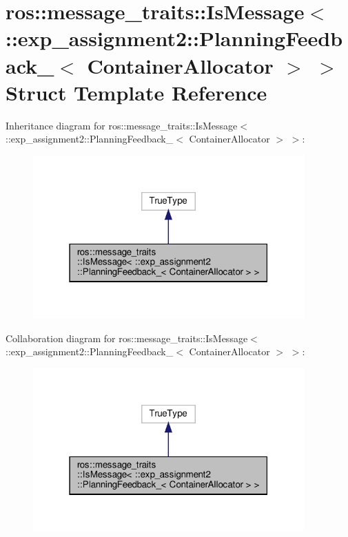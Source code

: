 \hypertarget{structros_1_1message__traits_1_1IsMessage_3_01_1_1exp__assignment2_1_1PlanningFeedback___3_01ContainerAllocator_01_4_01_4}{}\section{ros\+:\+:message\+\_\+traits\+:\+:Is\+Message$<$ \+:\+:exp\+\_\+assignment2\+:\+:Planning\+Feedback\+\_\+$<$ Container\+Allocator $>$ $>$ Struct Template Reference}
\label{structros_1_1message__traits_1_1IsMessage_3_01_1_1exp__assignment2_1_1PlanningFeedback___3_01ContainerAllocator_01_4_01_4}


Inheritance diagram for ros\+:\+:message\+\_\+traits\+:\+:Is\+Message$<$ \+:\+:exp\+\_\+assignment2\+:\+:Planning\+Feedback\+\_\+$<$ Container\+Allocator $>$ $>$\+:
\nopagebreak
\begin{figure}[H]
\begin{center}
\leavevmode
\includegraphics[width=295pt]{structros_1_1message__traits_1_1IsMessage_3_01_1_1exp__assignment2_1_1PlanningFeedback___3_01Con1155950b8739c3e70a7ec945843a5964}
\end{center}
\end{figure}


Collaboration diagram for ros\+:\+:message\+\_\+traits\+:\+:Is\+Message$<$ \+:\+:exp\+\_\+assignment2\+:\+:Planning\+Feedback\+\_\+$<$ Container\+Allocator $>$ $>$\+:
\nopagebreak
\begin{figure}[H]
\begin{center}
\leavevmode
\includegraphics[width=295pt]{structros_1_1message__traits_1_1IsMessage_3_01_1_1exp__assignment2_1_1PlanningFeedback___3_01Con6209d375db56451598a716735ab9659e}
\end{center}
\end{figure}


